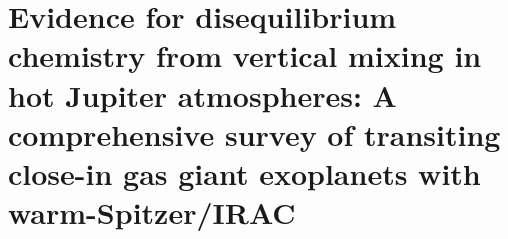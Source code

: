 
\chapter[Evidence for disequilibrium chemistry from vertical mixing in hot Jupiter atmospheres: A comprehensive survey of transiting close-in gas giant exoplanets with warm-Spitzer/IRAC]{Evidence for disequilibrium chemistry from vertical mixing in hot Jupiter atmospheres: A comprehensive survey of transiting close-in gas giant exoplanets with warm-Spitzer/IRAC}
\label{transits}

\graphicspath{{./gfx/SpitzerStatisticalSurvey/}}


